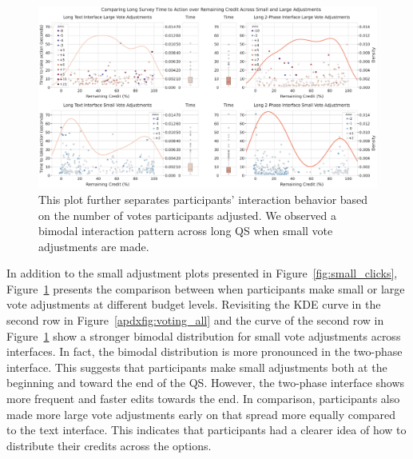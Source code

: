 \begin{figure}[ht]
    \centering
    \includegraphics[width=\textwidth]{content/image/results/combined_density_plots.pdf}
    \caption{This plot further separates participants' interaction behavior based on the number of votes participants adjusted. We observed a bimodal interaction pattern across long QS when small vote adjustments are made.}
    \label{apdxfig:voting_v3_v4}
\end{figure}

In addition to the small adjustment plots presented in Figure~\ref{fig:small_clicks}, Figure~\ref{apdxfig:voting_v3_v4} presents the comparison between when participants make small or large vote adjustments at different budget levels. Revisiting the KDE curve in the second row in Figure~\ref{apdxfig:voting_all} and the curve of the second row in Figure~\ref{apdxfig:voting_v3_v4} show a stronger bimodal distribution for small vote adjustments across interfaces. In fact, the bimodal distribution is more pronounced in the two-phase interface. This suggests that participants make small adjustments both at the beginning and toward the end of the QS. However, the two-phase interface shows more frequent and faster edits towards the end. In comparison, participants also made more large vote adjustments early on that spread more equally compared to the text interface. This indicates that participants had a clearer idea of how to distribute their credits across the options.